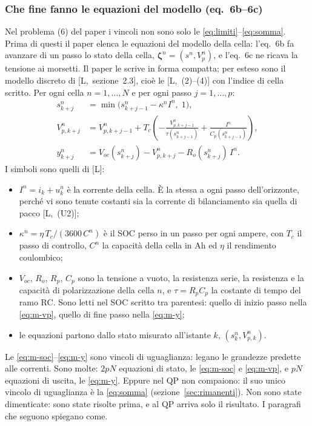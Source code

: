 \documentclass[11pt,a4paper]{article}
\newcommand{\rif}{[L]}                      %
\newcommand{\vett}[1]{\boldsymbol{#1}}      %
\begin{document}
\subsubsection{Che fine fanno le equazioni del modello (eq.~6b--6c)}

Nel problema (6) del paper i vincoli non sono solo le
\eqref{eq:limiti}--\eqref{eq:somma}. Prima di questi il paper elenca le
equazioni del modello della cella: l'eq.~6b fa avanzare di un passo lo stato
della cella, $\vett{\zeta}^n = (s^n, V^n_p)$, e l'eq.~6c ne ricava la tensione ai
morsetti. Il paper le scrive in forma compatta; per esteso sono il modello
discreto di [L,~sezione~2.3], cioè le [L,~(2)--(4)] con l'indice di cella
scritto. Per ogni cella $n = 1,\dots,N$ e per ogni passo $j = 1,\dots,p$:
\begin{align}
  s^n_{k+j} &= \min\bigl(s^n_{k+j-1} - \kappa^n I^n,\; 1\bigr) ,
     \tag{M1}\label{eq:m-soc}\\
  V^n_{p,k+j} &= V^n_{p,k+j-1}
     + T_c \left( -\frac{V^n_{p,k+j-1}}{\tau(s^n_{k+j-1})}
                  + \frac{I^n}{C_p(s^n_{k+j-1})} \right) ,
     \tag{M2}\label{eq:m-vp}\\
  y^n_{k+j} &= V_{oc}(s^n_{k+j}) - V^n_{p,k+j} - R_o(s^n_{k+j})\, I^n .
     \tag{M3}\label{eq:m-y}
\end{align}
I simboli sono quelli di \rif:
\begin{itemize}
  \item $I^n = i_k + u^n_k$ è la corrente della cella. È la stessa a ogni
        passo dell'orizzonte, perché vi sono tenute costanti sia la corrente di
        bilanciamento sia quella di pacco [L,~(U2)];
  \item $\kappa^n = \eta\, T_c / (3600\, C^n)$ è il SOC perso in un passo per
        ogni ampere, con $T_c$ il passo di controllo, $C^n$ la capacità della
        cella in Ah ed $\eta$ il rendimento coulombico;
  \item $V_{oc}$, $R_o$, $R_p$, $C_p$ sono la tensione a vuoto, la resistenza
        serie, la resistenza e la capacità di polarizzazione della cella $n$, e
        $\tau = R_p C_p$ la costante di tempo del ramo RC. Sono letti nel SOC
        scritto tra parentesi: quello di inizio passo nella \eqref{eq:m-vp},
        quello di fine passo nella \eqref{eq:m-y};
  \item le equazioni partono dallo stato misurato all'istante $k$,
        $(s^n_k, V^n_{p,k})$.
\end{itemize}
Le \eqref{eq:m-soc}--\eqref{eq:m-y} sono vincoli di uguaglianza: legano le
grandezze predette alle correnti. Sono molte: $2pN$ equazioni di stato, le
\eqref{eq:m-soc} e \eqref{eq:m-vp}, e $pN$ equazioni di uscita, le
\eqref{eq:m-y}. Eppure nel QP non compaiono: il suo unico vincolo di
uguaglianza è la \eqref{eq:somma} (sezione~\ref{sec:rimanenti}). Non sono state
dimenticate: sono state risolte prima, e al QP arriva solo il risultato. I
paragrafi che seguono spiegano come.
\end{document}

